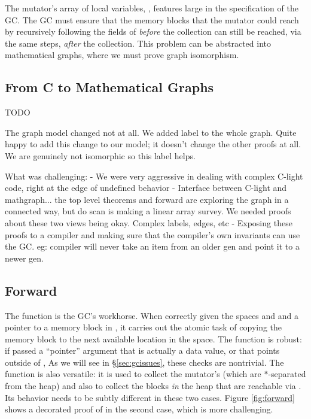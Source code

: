 The mutator's array of local variables, , features large in the specification 
of the GC. The GC must ensure that the memory blocks that the mutator 
could reach by recursively following the fields of  \emph{before} the 
collection can still be reached, via the same steps, \emph{after} the collection.
This problem can be abstracted into mathematical graphs,
where we must prove graph isomorphism.

\subsection{From C to Mathematical Graphs}
\label{sec:movetomathgraph}
{\color{red}
TODO 

The graph model changed not at all. We added label to the whole graph. Quite happy to add this change to our model; it doesn't change the other proofs at all. We are genuinely not isomorphic so this label helps. 

What was challenging:
	- We were very aggressive in dealing with complex C-light code, right at the edge of undefined behavior
	- Interface between C-light and mathgraph... the top level theorems and forward are exploring the graph in a connected way, but do scan is making a linear array survey. We needed proofs about these two views being okay. Complex labels, edges, etc
	- Exposing these proofs to a compiler and making sure that the compiler's own invariants can use the GC. eg: compiler will never take an item from an older gen and point it to a newer gen.
}

\subsection{Forward}
\label{sec:gcforward}
The function  is the GC's workhorse.
When correctly given the spaces  and  and a pointer 
 to a memory block in ,
it carries out the atomic task of copying the memory block to the next
available location in the  space. 
The function is robust: if passed a ``pointer'' argument 
that is actually a data value, or that points outside of 
,  
As we will see in \S\ref{sec:gcissues}, these checks are nontrivial. 
The function is also versatile: it is used to collect the 
mutator's  (which are $*$-separated from the heap) 
and also to collect the blocks \emph{in} the heap that are reachable via 
. Its behavior needs to be subtly different in these
two cases.
Figure \ref{fig:forward} shows a decorated proof of  
in the second case, which is more challenging.

